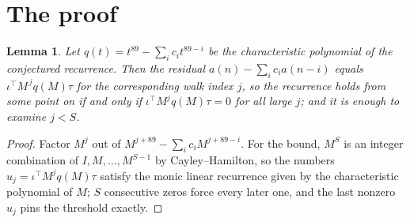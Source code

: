 \documentclass[11pt,a4paper]{article}
\theoremstyle{plain}
\newtheorem{lemma}[theorem]{Lemma}
\theoremstyle{definition}
\begin{document}
\section{The proof}

\begin{lemma}\label{lem:crit}
Let $q(t)=t^{89}-\sum_i c_it^{89-i}$ be the characteristic polynomial of the
conjectured recurrence. Then the residual $a(n)-\sum_ic_ia(n-i)$ equals
$\iota^{\!\top}M^{\,j}q(M)\tau$ for the corresponding walk index $j$, so the
recurrence holds from some point on if and only if $\iota^{\!\top}M^{j}q(M)\tau=0$ for all
large $j$; and it is enough to examine $j<S$.
\end{lemma}

\begin{proof}
Factor $M^{j}$ out of $M^{j+89}-\sum_ic_iM^{j+89-i}$. For the bound, $M^{S}$
is an integer combination of $I,M,\dots,M^{S-1}$ by Cayley--Hamilton, so the numbers
$u_j=\iota^{\!\top}M^{j}q(M)\tau$ satisfy the monic linear recurrence given by the
characteristic polynomial of $M$; $S$ consecutive zeros force every later one, and the last
nonzero $u_j$ pins the threshold exactly.
\end{proof}
\end{document}
